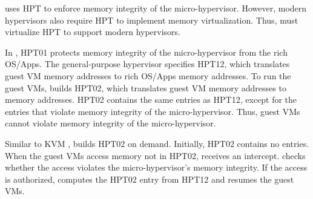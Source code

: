  uses HPT to enforce memory integrity of the micro-hypervisor. However, modern hypervisors also require HPT to implement memory virtualization. Thus,  must virtualize HPT to support modern hypervisors.

In , HPT01 protects memory integrity of the micro-hypervisor from the rich OS/Apps. The general-purpose hypervisor specifies HPT12, which translates guest VM memory addresses to rich OS/Apps memory addresses. To run the guest VMs,  builds HPT02, which translates guest VM memory addresses to  memory addresses. HPT02 contains the same entries as HPT12, except for the entries that violate memory integrity of the micro-hypervisor. Thus, guest VMs cannot violate memory integrity of the micro-hypervisor.

Similar to KVM \cite{ben2010turtles},  builds HPT02 on demand. Initially, HPT02 contains no entries. When the guest VMs access memory not in HPT02,  receives an intercept.  checks whether the access violates the micro-hypervisor's memory integrity. If the access is authorized,  computes the HPT02 entry from HPT12 and resumes the guest VMs.

